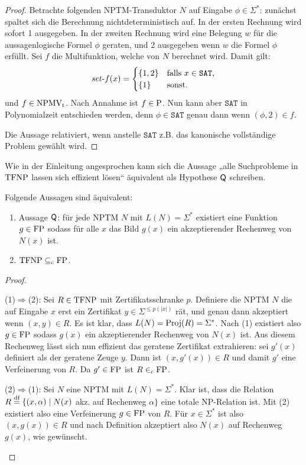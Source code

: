 \begin{proof}
    Betrachte folgenden NPTM-Transduktor $N$ auf Eingabe $\phi\in\Sigma^*$: zunächst spaltet sich die Berechnung nichtdeterministisch auf. In der ersten Rechnung wird sofort 1 ausgegeben. In der zweiten Rechnung wird eine Belegung $w$ für die aussagenlogische Formel $\phi$ geraten, und 2 ausgegeben wenn $w$ die Formel $\phi$ erfüllt. Sei $f$ die Multifunktion, welche von $N$ berechnet wird.
    Damit gilt:
    \[ \fset{}f(x) = \begin{cases} \{ 1, 2\} & \text{falls $x\in\mathtt{SAT}$,} \\ \{ 1\} & \text{sonst. } \end{cases} \]
    und $f\in\NPMVt$.
    Nach Annahme ist $f\in \P$. Nun kann aber $\mathtt{SAT}$ in Polynomialzeit entschieden werden, denn $\phi\in\mathtt{SAT}$ genau dann wenn $(\phi, 2) \in f$.

    Die Aussage relativiert, wenn anstelle $\mathtt{SAT}$ z.B. das kanonische vollständige Problem gewählt wird.
\end{proof}
Wie in der Einleitung angesprochen kann sich die Aussage „alle Suchprobleme in $\TFNP$ lassen sich effizient lösen“ äquivalent als Hypothese $\hQ$ schreiben.
\begin{observation}\label{obs:tfnp-q}
    Folgende Aussagen sind äquivalent:
    \begin{enumerate}
        \item Aussage $\hQ$: für jede NPTM $N$ mit $L(N)=\Sigma^*$ existiert eine Funktion $g\in\FP$ sodass für alle $x$ das Bild $g(x)$ ein akzeptierender Rechenweg von $N(x)$ ist. 
        \item $\TFNP\subseteqc \FP$.
    \end{enumerate}
\end{observation}
\begin{proof}
\begin{prooflist}[label={}]
\item (1)$\Rightarrow$(2): Sei $R\in\TFNP$ mit Zertifikatsschranke $p$. Definiere die NPTM $N$ die auf Eingabe $x$ erst ein Zertifikat $y\in\Sigma^{\leq p(|x|)}$ rät, und genau dann akzeptiert wenn $(x,y)\in R$. Es ist klar, dass $L(N)=\Proj(R)=\Sigma^*$. Nach (1) existiert also $g\in\FP$ sodass $g(x)$ ein akzeptierender Rechenweg von $N(x)$ ist. Aus diesem Rechenweg lässt sich nun effizient das geratene Zertifikat extrahieren: sei $g'(x)$ definiert als der geratene Zeuge $y$. Dann ist $(x,g'(x))\in R$ und damit $g'$ eine Verfeinerung von $R$. Da $g'\in\FP$ ist $R\inc\FP$.

\item (2)$\Rightarrow$(1): Sei $N$ eine NPTM mit $L(N)=\Sigma^*$. Klar ist, dass die Relation $R\defeq \{ (x,\alpha) \mid N(x)$ akz. auf Rechenweg $\alpha\}$ eine totale NP-Relation ist.
    Mit (2) existiert also eine Verfeinerung $g\in\FP$ von $R$. Für $x\in\Sigma^*$ ist also $(x, g(x))\in R$ und nach Definition akzeptiert also $N(x)$ auf Rechenweg $g(x)$, wie gewünscht.
\end{prooflist}
\end{proof}

